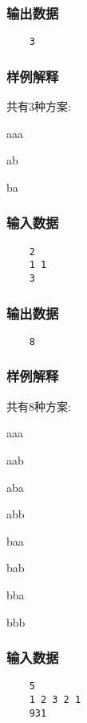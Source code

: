 \documentclass{article}
\begin{document}
\begin{CJK*}{UTF8}{gbsn}
\begin{spacing}{0.8}
\begin{multicols}{3}
    \subsubsection*{输出数据}
    \begin{verbatim}
    3
    \end{verbatim}

    \subsubsection*{样例解释}
    {\footnotesize{
    共有$3$种方案:

    aaa

    ab

    ba
    }}

    \columnbreak

    \subsubsection*{输入数据}
    \begin{verbatim}
    2
    1 1
    3
    \end{verbatim}

    \subsubsection*{输出数据}
    \begin{verbatim}
    8
    \end{verbatim}

    \subsubsection*{样例解释}
    {\footnotesize{
    共有$8$种方案:

    aaa

    aab

    aba

    abb

    baa

    bab

    bba

    bbb
    }}

    \columnbreak

    \subsubsection*{输入数据}
    \begin{verbatim}
    5
    1 2 3 2 1
    931
    \end{verbatim}


\end{multicols}
\end{spacing}
\end{CJK*}
\end{document}
